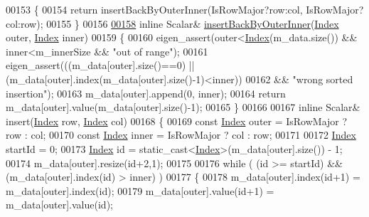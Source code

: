 \begin{DoxyCode}
00153     \{
00154       \textcolor{keywordflow}{return} insertBackByOuterInner(IsRowMajor?row:col, IsRowMajor?col:row);
00155     \}
00156 
\hyperlink{class_eigen_1_1_dynamic_sparse_matrix_ac97c2463058ae55d7f0ef21c851eb5f3}{00158}     \textcolor{keyword}{inline} Scalar& \hyperlink{class_eigen_1_1_dynamic_sparse_matrix_ac97c2463058ae55d7f0ef21c851eb5f3}{insertBackByOuterInner}(\hyperlink{group___core___module_a554f30542cc2316add4b1ea0a492ff02}{Index} outer, 
      \hyperlink{group___core___module_a554f30542cc2316add4b1ea0a492ff02}{Index} inner)
00159     \{
00160       eigen\_assert(outer<\hyperlink{namespace_eigen_a62e77e0933482dafde8fe197d9a2cfde}{Index}(m\_data.size()) && inner<m\_innerSize && \textcolor{stringliteral}{"out of range"});
00161       eigen\_assert(((m\_data[outer].size()==0) || (m\_data[outer].index(m\_data[outer].size()-1)<inner))
00162                 && \textcolor{stringliteral}{"wrong sorted insertion"});
00163       m\_data[outer].append(0, inner);
00164       \textcolor{keywordflow}{return} m\_data[outer].value(m\_data[outer].size()-1);
00165     \}
00166 
00167     \textcolor{keyword}{inline} Scalar& insert(\hyperlink{group___core___module_a554f30542cc2316add4b1ea0a492ff02}{Index} row, \hyperlink{group___core___module_a554f30542cc2316add4b1ea0a492ff02}{Index} col)
00168     \{
00169       \textcolor{keyword}{const} \hyperlink{group___core___module_a554f30542cc2316add4b1ea0a492ff02}{Index} outer = IsRowMajor ? row : col;
00170       \textcolor{keyword}{const} \hyperlink{group___core___module_a554f30542cc2316add4b1ea0a492ff02}{Index} inner = IsRowMajor ? col : row;
00171 
00172       \hyperlink{group___core___module_a554f30542cc2316add4b1ea0a492ff02}{Index} startId = 0;
00173       \hyperlink{group___core___module_a554f30542cc2316add4b1ea0a492ff02}{Index} \textcolor{keywordtype}{id} = \textcolor{keyword}{static\_cast<}\hyperlink{group___core___module_a554f30542cc2316add4b1ea0a492ff02}{Index}\textcolor{keyword}{>}(m\_data[outer].size()) - 1;
00174       m\_data[outer].resize(\textcolor{keywordtype}{id}+2,1);
00175 
00176       \textcolor{keywordflow}{while} ( (\textcolor{keywordtype}{id} >= startId) && (m\_data[outer].index(\textcolor{keywordtype}{id}) > inner) )
00177       \{
00178         m\_data[outer].index(\textcolor{keywordtype}{id}+1) = m\_data[outer].index(\textcolor{keywordtype}{id});
00179         m\_data[outer].value(\textcolor{keywordtype}{id}+1) = m\_data[outer].value(\textcolor{keywordtype}{id});

\end{DoxyCode}
